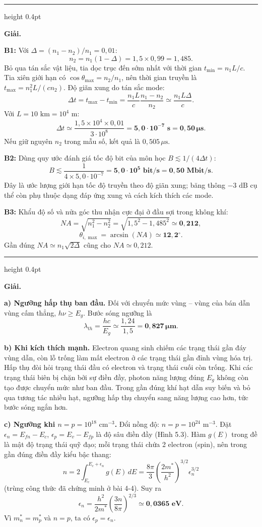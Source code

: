 \documentclass[11pt,a4paper]{article}
\renewcommand{\boldsymbol}[1]{\symbf{#1}}
\let\DeBaiOriginal\DeBai
\renewcommand{\DeBai}[1]{\par\Needspace{5\baselineskip}\DeBaiOriginal{#1}}
\newcommand{\PhanCachBai}{%
  \par\Needspace{7\baselineskip}%
  \addvspace{6pt}%
  {\color{black!40}\hrule height 0.4pt}%
  \nobreak\vspace{7pt}\nobreak
}
\begin{document}
\PhanCachBai


\textbf{Giải.}

\textbf{B1:} Với $\Delta=(n_1-n_2)/n_1=0{,}01$:
\[
n_2=n_1(1-\Delta)=1{,}5\times0{,}99=1{,}485.
\]
Bỏ qua tán sắc vật liệu, tia dọc trục đến sớm nhất với thời gian
$t_{\min}=n_1L/c$. Tia xiên giới hạn có $\cos\theta_{\max}=n_2/n_1$,
nên thời gian truyền là $t_{\max}=n_1^2L/(cn_2)$.
Độ giãn xung do tán sắc mode:
\[
\Delta t=t_{\max}-t_{\min}
=\frac{n_1L}{c}\frac{n_1-n_2}{n_2}
\simeq\frac{n_1L\Delta}{c}.
\]
Với $L=10\text{ km}=10^4\text{ m}$:
\[
\Delta t\simeq\frac{1{,}5\times10^4\times0{,}01}{3\cdot10^8}
=\boldsymbol{5{,}0\cdot10^{-7}\text{ s}=0{,}50\,\mu\text{s}}.
\]
Nếu giữ nguyên $n_2$ trong mẫu số, kết quả là $0{,}505\,\mu\text{s}$.

\textbf{B2:} Dùng quy ước đánh giá tốc độ bit của môn học $B\lesssim1/(4\Delta t)$:
\[
B\lesssim\frac1{4\times5{,}0\cdot10^{-7}}
=\boldsymbol{5{,}0\cdot10^5\text{ bit/s}=0{,}50\text{ Mbit/s}}.
\]
Đây là ước lượng giới hạn tốc độ truyền theo độ giãn xung; băng thông $-3\text{ dB}$
cụ thể còn phụ thuộc dạng đáp ứng xung và cách kích thích các mode.

\textbf{B3:} Khẩu độ số và nửa góc thu nhận cực đại ở đầu sợi trong không khí:
\[
NA=\sqrt{n_1^2-n_2^2}
=\sqrt{1{,}5^2-1{,}485^2}\simeq\boldsymbol{0{,}212},
\]
\[
\theta_{i,\max}=\arcsin(NA)\simeq\boldsymbol{12{,}2^\circ}.
\]
Gần đúng $NA\simeq n_1\sqrt{2\Delta}$ cũng cho $NA\simeq0{,}212$.

\PhanCachBai


\textbf{Giải.}

\textbf{a) Ngưỡng hấp thụ ban đầu.}
Đối với chuyển mức vùng -- vùng của bán dẫn vùng cấm thẳng,
$h\nu\ge E_g$. Bước sóng ngưỡng là
\[
\lambda_{th}=\frac{hc}{E_g}\simeq\frac{1{,}24}{1{,}5}
=\boldsymbol{0{,}827\,\mu\text{m}}.
\]

\textbf{b) Khi kích thích mạnh.}
Electron quang sinh chiếm các trạng thái gần đáy vùng dẫn, còn lỗ trống làm mất electron
ở các trạng thái gần đỉnh vùng hóa trị. Hấp thụ đòi hỏi trạng thái đầu có electron
và trạng thái cuối còn trống. Khi các trạng thái biên bị chặn bởi sự điền đầy,
photon năng lượng đúng $E_g$ không còn tạo được chuyển mức như ban đầu.
Trong gần đúng khí hạt dẫn suy biến và bỏ qua tương tác nhiều hạt,
ngưỡng hấp thụ chuyển sang năng lượng cao hơn, tức bước sóng ngắn hơn.

\textbf{c) Ngưỡng khi $n=p=10^{18}\text{ cm}^{-3}$.}
Đổi nồng độ: $n=p=10^{24}\text{ m}^{-3}$.
Đặt $\epsilon_n=E_{fn}-E_c$, $\epsilon_p=E_v-E_{fp}$ là độ sâu điền đầy (Hình 5.3).
Hàm $g(E)$ trong đề là mật độ trạng thái quỹ đạo; mỗi trạng thái chứa 2 electron (spin), nên trong gần đúng điền đầy kiểu bậc thang:
\[
n=2\int_{E_c}^{E_c+\epsilon_n}g(E)\,dE
=\frac{8\pi}{3}\left(\frac{2m^*}{h^2}\right)^{3/2}\epsilon_n^{3/2}
\]
(trùng công thức đã chứng minh ở bài 4-4). Suy ra
\[
\epsilon_n=\frac{h^2}{2m^*}\left(\frac{3n}{8\pi}\right)^{2/3}
\simeq\boldsymbol{0{,}0365\text{ eV}}.
\]
Vì $m_n^*=m_p^*$ và $n=p$, ta có $\epsilon_p=\epsilon_n$.
\end{document}
